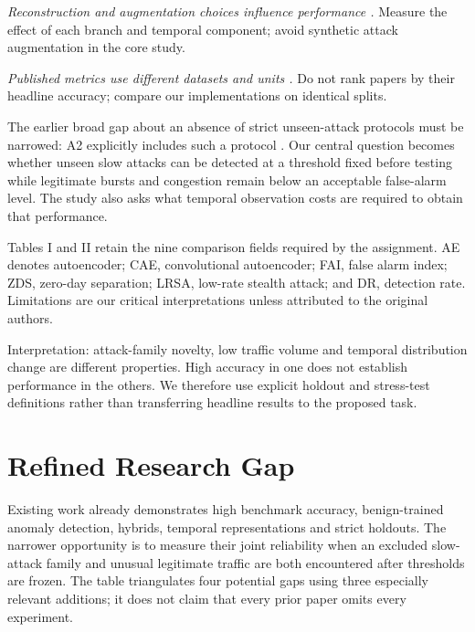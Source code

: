 \documentclass[conference]{IEEEtran}
\begin{document}
\noindent\textit{Reconstruction and augmentation choices influence performance \cite{ref5,ref6,ref8}.} Measure the effect of each branch and temporal component; avoid synthetic attack augmentation in the core study.

\noindent\textit{Published metrics use different datasets and units \cite{ref4,ref5,ref6,ref7,ref8,ref9,ref10,ref11}.} Do not rank papers by their headline accuracy; compare our implementations on identical splits.

The earlier broad gap about an absence of strict unseen-attack protocols must be narrowed: A2 explicitly includes such a protocol \cite{ref5}. Our central question becomes whether unseen slow attacks can be detected at a threshold fixed before testing while legitimate bursts and congestion remain below an acceptable false-alarm level. The study also asks what temporal observation costs are required to obtain that performance.

Tables I and II retain the nine comparison fields required by the assignment. AE denotes autoencoder; CAE, convolutional autoencoder; FAI, false alarm index; ZDS, zero-day separation; LRSA, low-rate stealth attack; and DR, detection rate. Limitations are our critical interpretations unless attributed to the original authors.

Interpretation: attack-family novelty, low traffic volume and temporal distribution change are different properties. High accuracy in one does not establish performance in the others. We therefore use explicit holdout and stress-test definitions rather than transferring headline results to the proposed task.

\section{Refined Research Gap}
\label{sec:gap}
Existing work already demonstrates high benchmark accuracy, benign-trained anomaly detection, hybrids, temporal representations and strict holdouts. The narrower opportunity is to measure their joint reliability when an excluded slow-attack family and unusual legitimate traffic are both encountered after thresholds are frozen. The table triangulates four potential gaps using three especially relevant additions; it does not claim that every prior paper omits every experiment.
\end{document}

